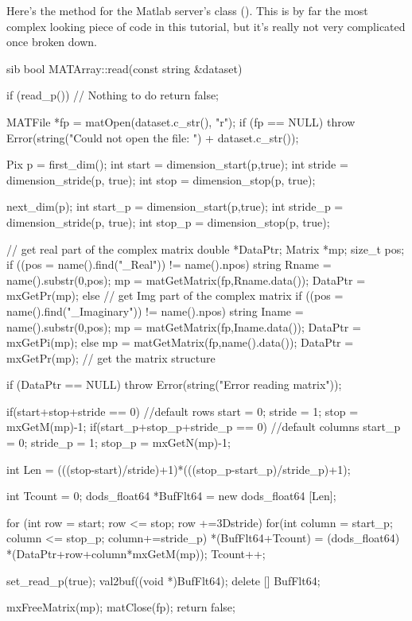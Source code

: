 \documentclass{dods-paper}
\begin{document}
Here's the  method for the Matlab server's  class
(). This is by far the most complex looking piece of code in
this tutorial, but it's really not very complicated once broken down.

\begin{vcode}{sib}
bool
MATArray::read(const string &dataset)
{
    if (read_p())  // Nothing to do
        return false;

    MATFile *fp = matOpen(dataset.c_str(), "r");
    if (fp == NULL)
        throw Error(string("Could not open the file: ") + dataset.c_str());
  
    Pix p = first_dim();
    int start = dimension_start(p,true);
    int stride = dimension_stride(p, true);
    int stop = dimension_stop(p, true); 

    next_dim(p);
    int start_p = dimension_start(p,true);
    int stride_p = dimension_stride(p, true);
    int stop_p = dimension_stop(p, true); 


    // get real part of the complex  matrix
    double *DataPtr;
    Matrix *mp;
    size_t pos;
    if ((pos = name().find("_Real")) != name().npos) {  
        string Rname = name().substr(0,pos);
        mp = matGetMatrix(fp,Rname.data());
        DataPtr = mxGetPr(mp); 
    }
    else{
        // get Img part of the complex matrix
        if ((pos = name().find("_Imaginary")) != name().npos) {  
            string Iname = name().substr(0,pos);
            mp = matGetMatrix(fp,Iname.data());
            DataPtr = mxGetPi(mp); 
        }
        else{
            mp = matGetMatrix(fp,name().data());
            DataPtr = mxGetPr(mp); // get the matrix structure
        }
    }

    if (DataPtr == NULL)
        throw Error(string("Error reading matrix"));

    if(start+stop+stride == 0){ //default rows
        start = 0;
        stride = 1;
        stop = mxGetM(mp)-1;
    }
    if(start_p+stop_p+stride_p == 0){ //default columns
        start_p = 0;
        stride_p = 1;
        stop_p = mxGetN(mp)-1;
    }

    int Len = (((stop-start)/stride)+1)*(((stop_p-start_p)/stride_p)+1);
  
    int Tcount = 0;
    dods_float64 *BufFlt64 = new dods_float64 [Len];    
  
    for (int row = start; row <= stop; row +=3Dstride) {          
        for(int column = start_p; column <= stop_p; column+=stride_p) {
            *(BufFlt64+Tcount) = (dods_float64)
            *(DataPtr+row+column*mxGetM(mp));  
            Tcount++;
        }
    }

    set_read_p(true);      
    val2buf((void *)BufFlt64);
    delete [] BufFlt64;
          
    mxFreeMatrix(mp);
    matClose(fp);
    return false;
}
\end{vcode}
\end{document}
